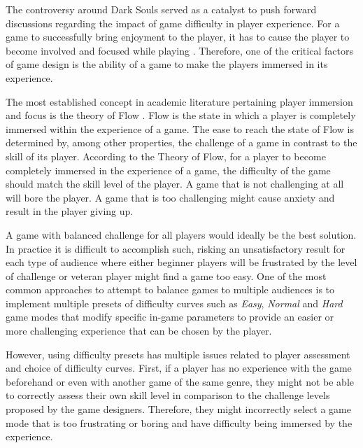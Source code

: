 The controversy around Dark Souls served as a catalyst to push forward discussions regarding the impact of game difficulty in player experience. For a game to successfully bring enjoyment to the player, it has to cause the player to become involved and focused while playing \cite{ARTICLE_FlowInGames}. Therefore, one of the critical factors of game design is the ability of a game to make the players immersed in its experience. 

The most established concept in academic literature pertaining player immersion and focus is the theory of Flow \cite{BOOK_Flow}. Flow is the state in which a player is completely immersed within the experience of a game. The ease to reach the state of Flow is determined by, among other properties, the challenge of a game in contrast to the skill of its player. According to the Theory of Flow, for a player to become completely immersed in the experience of a game, the difficulty of the game should match the skill level of the player. A game that is not challenging at all will bore the player. A game that is too challenging might cause anxiety and result in the player giving up.

A game with balanced challenge for all players would ideally be the best solution. In practice it is difficult to accomplish such, risking an unsatisfactory result for each type of audience where either beginner players will be frustrated by the level of challenge or veteran player might find a game too easy. One of the most common approaches to attempt to balance games to multiple audiences is to implement multiple presets of difficulty curves such as \emph{Easy}, \emph{Normal} and \emph{Hard} game modes that modify specific in-game parameters to provide an easier or more challenging experience that can be chosen by the player.

However, using difficulty presets has multiple issues related to player assessment and choice of difficulty curves. First, if a player has no experience with the game beforehand or even with another game of the same genre, they might not be able to correctly assess their own skill level in comparison to the challenge levels proposed by the game designers. Therefore, they might incorrectly select a game mode that is too frustrating or boring and have difficulty being immersed by the experience.

